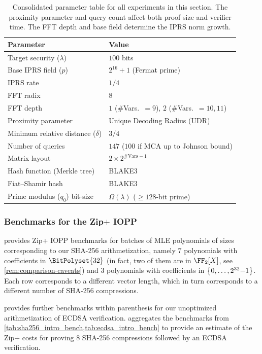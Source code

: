 \begin{table}[H]
\centering
\begin{tabular}{ll}
\toprule
\textbf{Parameter} & \textbf{Value} \\
\midrule
Target security ($\lambda$) & $100$ bits \\
Base IPRS field ($p$) & $2^{16}+1$ (Fermat prime) \\
IPRS rate & $1/4$ \\
FFT radix & $8$ \\
FFT depth & $1$ (\#Vars.~$=9$), $2$ (\#Vars.~$=10,11$) \\
Proximity parameter & Unique Decoding Radius (UDR) \\
Minimum relative distance ($\delta$) & $3/4$ \\
Number of queries & $147$ ($100$ if MCA up to Johnson bound) \\
Matrix layout & $2 \times 2^{\text{\#Vars}-1}$ \\
Hash function (Merkle tree) & BLAKE3 \\
Fiat--Shamir hash & BLAKE3 \\
Prime modulus ($q_0$) bit-size & $\Omega(\lambda)$ ($\geq 128$-bit prime) \\
\bottomrule
\end{tabular}
\caption{Consolidated parameter table for all experiments in this section. The proximity parameter and query count affect both proof size and verifier time. The FFT depth and base field determine the IPRS norm growth.  %
}
\label{tab:parameter_summary}
\end{table}

 
\subsubsection{Benchmarks for the Zip$+$ IOPP}

 provides Zip+ IOPP benchmarks for batches of MLE polynomials of sizes corresponding to our SHA-256 arithmetization, namely $7$ polynomials with coefficients in $\BitPolyset{32}$ (in fact, two of them are in $\FF_2[X]$, see \cref{rem:comparison-caveats}) and $3$ polynomials with coefficients in $\range{0}{2^{32}{-}1}$.   Each row corresponds to a different vector length, which in turn corresponds to a different number of SHA-256 compressions. 

 provides further benchmarks within parenthesis for our unoptimized arithmetization of ECDSA verification.   aggregates the benchmarks from \cref{tab:sha256_intro_bench,tab:ecdsa_intro_bench} to provide an estimate of the Zip+ costs for proving $8$ SHA-256 compressions followed by an ECDSA verification.


